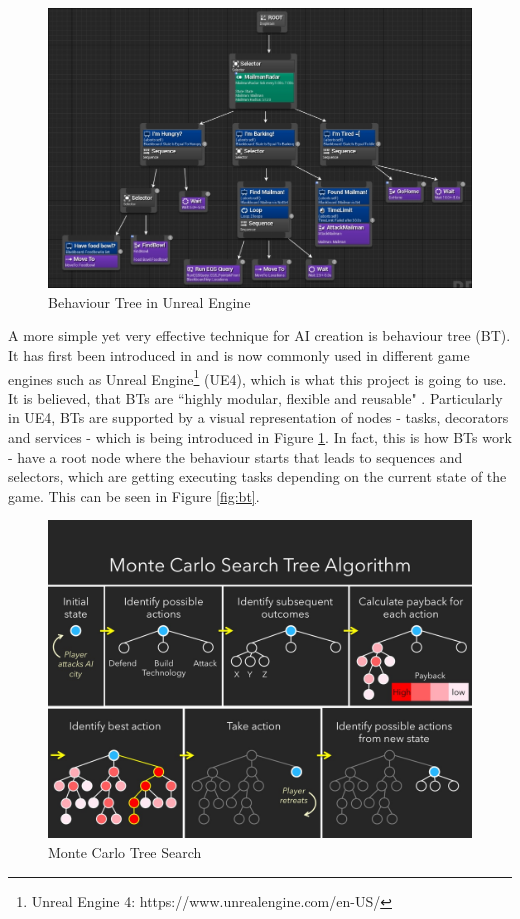 \documentclass[journal]{IEEEtran}
\begin{document}
\begin{figure}
	\includegraphics[width=\linewidth]{UnrealBehaviourTree.jpg}
	\caption{Behaviour Tree in Unreal Engine}
	\label{fig:ubt}
\end{figure}

A more simple yet very effective technique for AI creation is behaviour tree (BT). It has first been introduced in \cite{gdchalo2} and is now commonly used in different game engines such as Unreal Engine\footnote{\label{engine}Unreal Engine 4: https://www.unrealengine.com/en-US/} (UE4), which is what this project is going to use. It is believed, that BTs are ``highly modular, flexible and reusable" \cite{colledanchise2017behavior}. Particularly in UE4, BTs are supported by a visual representation of nodes - tasks, decorators and services - which is being introduced in Figure \ref{fig:ubt}. In fact, this is how BTs work - have a root node where the behaviour starts that leads to sequences and selectors, which are getting executing tasks depending on the current state of the game. This can be seen in Figure \ref{fig:bt}. %

\begin{figure}
	\includegraphics[width=\linewidth]{MCTS.jpg}
	\caption{Monte Carlo Tree Search \cite{lou2017}}
	\label{fig:mcts}
\end{figure}
\end{document}
